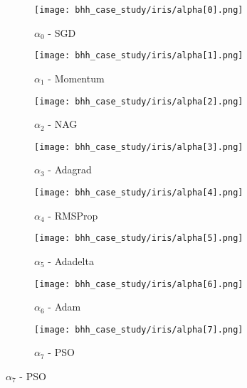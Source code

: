 \begin{figure}[htbp]
	\begin{subfigure}{0.5\textwidth}
		\centering
		\texttt{[image: bhh\_case\_study/iris/alpha[0].png]}
		\caption{$\alpha_{0}$ - \Acs{SGD}}
		\label{fig:results:case_study:iris:alpha:0}
	\end{subfigure}
	\begin{subfigure}{0.5\textwidth}
		\centering
		\texttt{[image: bhh\_case\_study/iris/alpha[1].png]}
		\caption{$\alpha_{1}$ - \Acs{Momentum}}
		\label{fig:results:case_study:iris:alpha:1}
	\end{subfigure}
	\par\bigskip
	\begin{subfigure}{0.5\textwidth}
		\centering
		\texttt{[image: bhh\_case\_study/iris/alpha[2].png]}
		\caption{$\alpha_{2}$ - \Acs{NAG}}
		\label{fig:results:case_study:iris:alpha:2}
	\end{subfigure}
	\begin{subfigure}{0.5\textwidth}
		\centering
		\texttt{[image: bhh\_case\_study/iris/alpha[3].png]}
		\caption{$\alpha_{3}$ - \Acs{Adagrad}}
		\label{fig:results:case_study:iris:alpha:3}
	\end{subfigure}
	\par\bigskip
	\begin{subfigure}{0.5\textwidth}
		\centering
		\texttt{[image: bhh\_case\_study/iris/alpha[4].png]}
		\caption{$\alpha_{4}$ - \Acs{RMSProp}}
		\label{fig:results:case_study:iris:alpha:4}
	\end{subfigure}
	\begin{subfigure}{0.5\textwidth}
		\centering
		\texttt{[image: bhh\_case\_study/iris/alpha[5].png]}
		\caption{$\alpha_{5}$ - \Acs{Adadelta}}
		\label{fig:results:case_study:iris:alpha:5}
	\end{subfigure}
	\par\bigskip
	\begin{subfigure}{0.5\textwidth}
		\centering
		\texttt{[image: bhh\_case\_study/iris/alpha[6].png]}
		\caption{$\alpha_{6}$ - \Acs{Adam}}
		\label{fig:results:case_study:iris:alpha:6}
	\end{subfigure}
	\begin{subfigure}{0.5\textwidth}
		\centering
		\texttt{[image: bhh\_case\_study/iris/alpha[7].png]}
		\caption{$\alpha_{7}$ - \Acs{PSO}}
		\label{fig:results:case_study:iris:alpha:7}
	\end{subfigure}

\end{figure}
